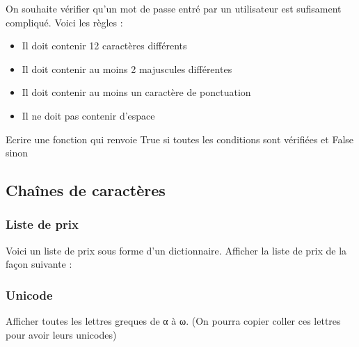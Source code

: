 \documentclass[letterpaper,10pt,english]{sphinxhowto}
\begin{document}
\sphinxAtStartPar
On souhaite vérifier qu’un mot de passe entré par un utilisateur est sufisament compliqué. Voici les règles :
\begin{itemize}
\item {} 
\sphinxAtStartPar
Il doit contenir 12 caractères différents

\item {} 
\sphinxAtStartPar
Il doit contenir au moins 2 majuscules différentes

\item {} 
\sphinxAtStartPar
Il doit contenir au moins un caractère de ponctuation 

\item {} 
\sphinxAtStartPar
Il ne doit pas contenir d’espace

\end{itemize}

\sphinxAtStartPar
Ecrire une fonction qui renvoie True si toutes les conditions sont vérifiées et False sinon


\subsection{Chaînes de caractères}
\label{\detokenize{cours4_chaine_caractere_exercices:chaines-de-caracteres}}\label{\detokenize{cours4_chaine_caractere_exercices::doc}}

\subsubsection{Liste de prix}
\label{\detokenize{cours4_chaine_caractere_exercices:liste-de-prix}}
\sphinxAtStartPar
Voici un liste de prix sous forme d’un dictionnaire. Afficher la liste de prix de la façon suivante :



\begin{sphinxVerbatim}[commandchars=\\\{\}]
  
\end{sphinxVerbatim}


\subsubsection{Unicode}
\label{\detokenize{cours4_chaine_caractere_exercices:unicode}}
\sphinxAtStartPar
Afficher toutes les lettres greques de α à ω. (On pourra copier coller ces lettres pour avoir leurs unicodes)
\end{document}
